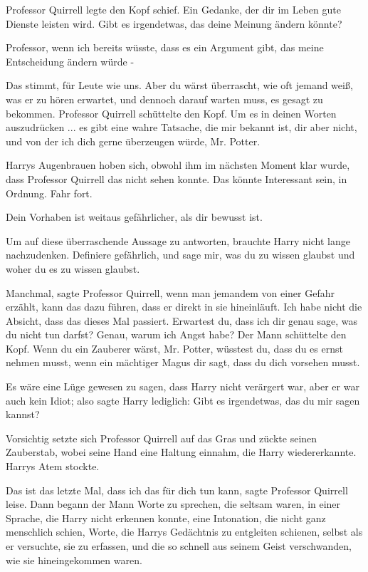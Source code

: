 Professor Quirrell legte den Kopf schief. \glqq{}Ein Gedanke, der dir im Leben
gute Dienste leisten wird. Gibt es irgendetwas, das deine Meinung ändern
könnte?\grqq{}

\glqq{}Professor, wenn ich bereits wüsste, dass es ein Argument gibt, das meine
Entscheidung ändern würde -\grqq{}

\glqq{}Das stimmt, für Leute wie uns. Aber du wärst überrascht, wie oft jemand
weiß, was er zu hören erwartet, und dennoch darauf warten muss, es gesagt zu
bekommen.\grqq{} Professor Quirrell schüttelte den Kopf. \glqq{}Um es in deinen
Worten auszudrücken ... es gibt eine wahre Tatsache, die mir bekannt ist, dir
aber nicht, und von der ich dich gerne überzeugen würde, Mr. Potter.\grqq{}

Harrys Augenbrauen hoben sich, obwohl ihm im nächsten Moment klar wurde, dass
Professor Quirrell das nicht sehen konnte. \glqq{}Das könnte Interessant sein, in
Ordnung. Fahr fort.\grqq{}

\glqq{}Dein Vorhaben ist weitaus gefährlicher, als dir bewusst ist.\grqq{}

Um auf diese überraschende Aussage zu antworten, brauchte Harry nicht lange
nachzudenken. \glqq{}Definiere gefährlich, und sage mir, was du zu wissen glaubst
und woher du es zu wissen glaubst.\grqq{}

\glqq{}Manchmal\grqq{}, sagte Professor Quirrell, \glqq{}wenn man jemandem von
einer Gefahr erzählt, kann das dazu führen, dass er direkt in sie hineinläuft.
Ich habe nicht die Absicht, dass das dieses Mal passiert. Erwartest du, dass ich
dir genau sage, was du nicht tun darfst? Genau, warum ich Angst habe?\grqq{} Der
Mann schüttelte den Kopf. \glqq{}Wenn du ein Zauberer wärst, Mr. Potter, wüsstest
du, dass du es ernst nehmen musst, wenn ein mächtiger Magus dir sagt, dass du
dich vorsehen musst.\grqq{}

Es wäre eine Lüge gewesen zu sagen, dass Harry nicht verärgert war, aber er war
auch kein Idiot; also sagte Harry lediglich: \glqq{}Gibt es irgendetwas, das du
mir sagen kannst?\grqq{}

Vorsichtig setzte sich Professor Quirrell auf das Gras und zückte seinen
Zauberstab, wobei seine Hand eine Haltung einnahm, die Harry wiedererkannte.
Harrys Atem stockte.

\glqq{}Das ist das letzte Mal, dass ich das für dich tun kann\grqq{}, sagte
Professor Quirrell leise. Dann begann der Mann Worte zu sprechen, die seltsam
waren, in einer Sprache, die Harry nicht erkennen konnte, eine Intonation, die
nicht ganz menschlich schien, Worte, die Harrys Gedächtnis zu entgleiten
schienen, selbst als er versuchte, sie zu erfassen, und die so schnell aus
seinem Geist verschwanden, wie sie hineingekommen waren.

